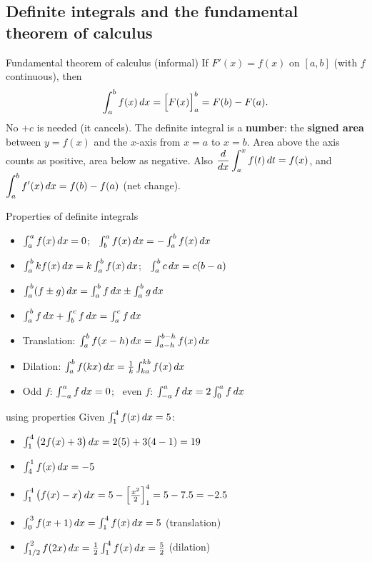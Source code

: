 \subsection{Definite integrals and the fundamental theorem of calculus}
\label{sec:definite}

\begin{keyres}{Fundamental theorem of calculus (informal)}
If $F'(x)=f(x)$ on $[a,b]$ (with $f$ continuous), then
\[\int_a^bf(x)\,dx=\Big[F(x)\Big]_a^b=F(b)-F(a).\]
No $+c$ is needed (it cancels). The definite integral is a \textbf{number}: the \textbf{signed area} between $y=f(x)$ and the $x$-axis from $x=a$ to $x=b$. Area above the axis counts as positive, area below as negative. Also $\displaystyle\dfrac{d}{dx}\int_a^xf(t)\,dt=f(x)$, and $\displaystyle\int_a^bf'(x)\,dx=f(b)-f(a)$ (net change).
\end{keyres}

\begin{cols}
\begin{keyres}{Properties of definite integrals}
\begin{itemize}
  \item $\int_a^af(x)\,dx=0$; \ $\int_b^af(x)\,dx=-\int_a^bf(x)\,dx$
  \item $\int_a^bkf(x)\,dx=k\int_a^bf(x)\,dx$; \ $\int_a^bc\,dx=c(b-a)$
  \item $\int_a^b(f\pm g)\,dx=\int_a^bf\,dx\pm\int_a^bg\,dx$
  \item $\int_a^bf\,dx+\int_b^cf\,dx=\int_a^cf\,dx$
  \item Translation: $\int_a^bf(x-h)\,dx=\int_{a-h}^{b-h}f(x)\,dx$
  \item Dilation: $\int_a^bf(kx)\,dx=\frac1k\int_{ka}^{kb}f(x)\,dx$
  \item Odd $f$: $\int_{-a}^af\,dx=0$; \ even $f$: $\int_{-a}^af\,dx=2\int_0^af\,dx$
\end{itemize}
\end{keyres}
\nextcol
\begin{example}{using properties \mcq}
Given $\int_1^4f(x)\,dx=5$:
\begin{itemize}
  \item $\int_1^4\big(2f(x)+3\big)\,dx=2(5)+3(4-1)=19$
  \item $\int_4^1f(x)\,dx=-5$
  \item $\int_1^4\big(f(x)-x\big)\,dx=5-\left[\frac{x^2}{2}\right]_1^4=5-7.5=-2.5$
  \item $\int_0^3f(x+1)\,dx=\int_1^4f(x)\,dx=5$ (translation)
  \item $\int_{1/2}^{2}f(2x)\,dx=\frac12\int_1^4f(x)\,dx=\frac52$ (dilation)
\end{itemize}
\end{example}
\end{cols}

